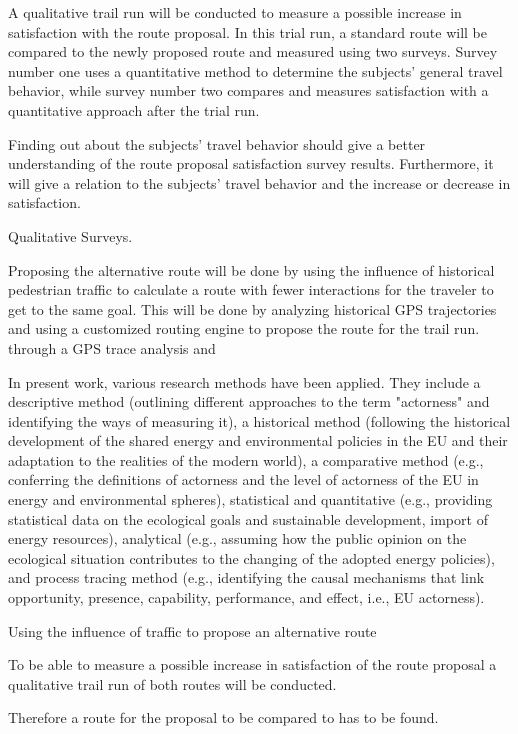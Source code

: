 A qualitative trail run will be conducted to measure a possible increase in satisfaction with the route proposal. In this trial run, a standard route will be compared to the newly proposed route and measured using two surveys. Survey number one uses a quantitative method to determine the subjects' general travel behavior, while survey number two compares and measures satisfaction with a quantitative approach after the trial run.

Finding out about the subjects' travel behavior should give a better understanding of the route proposal satisfaction survey results. Furthermore, it will give a relation to the subjects' travel behavior and the increase or decrease in satisfaction.

Qualitative Surveys.

Proposing the alternative route will be done by using the influence of historical pedestrian traffic to calculate a route with fewer interactions for the traveler to get to the same goal. This will be done by analyzing historical GPS trajectories and using a customized routing engine to propose the route for the trail run. through a GPS trace analysis and   


In present work, various research methods have been applied. They include a descriptive method (outlining different approaches to the term "actorness" and identifying the ways of measuring it), a historical method (following the historical development of the shared energy and environmental policies in the EU and their adaptation to the realities of the modern world), a comparative method (e.g., conferring the definitions of actorness and the level of actorness of the EU in energy and environmental spheres), statistical and quantitative (e.g., providing statistical data on the ecological goals and sustainable development, import of energy resources), analytical (e.g., assuming how the public opinion on the ecological situation contributes to the changing of the adopted energy policies), and process tracing method (e.g., identifying the causal mechanisms that link opportunity, presence, capability, performance, and effect, i.e., EU actorness).


Using the influence of traffic to propose an alternative route 

To be able to measure a possible increase in satisfaction of the route proposal a qualitative trail run of both routes will be conducted.

Therefore a route for the proposal to be compared to has to be found.

